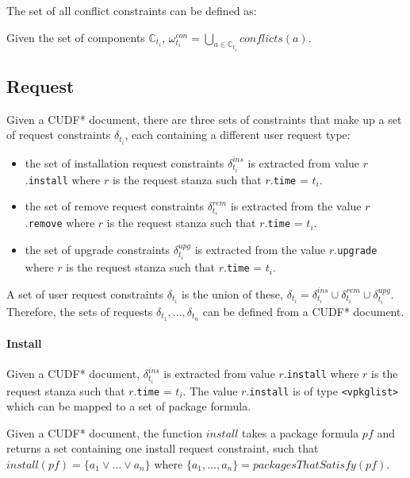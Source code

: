 The set of all conflict constraints can be defined as:
\begin{defs}
Given the set of components $\mathbb{C}_{t_i}$,
$\omega_{t_i}^{con} = \bigcup \limits_{a\in \mathbb{C}_{t_i}} conflicts(a)$.
\end{defs} 

\subsection{Request}
\label{formal.cudf.request}
Given a CUDF* document, there are three sets of constraints that make up a set of request constraints $\delta_{t_i}$, each containing a different user request type:
\begin{itemize}
  \item the set of installation request constraints $\delta_{t_i}^{ins}$ is extracted from value $r$.\texttt{install} where $r$ is the request stanza such that $r$.\texttt{time} = $t_i$.
  \item the set of remove request constraints  $\delta_{t_i}^{rem}$ is extracted from the value $r$.\texttt{remove} where $r$ is the request stanza such that $r$.\texttt{time} = $t_i$.
  \item the set of upgrade constraints $\delta_{t_i}^{upg}$ is extracted from the value $r$.\texttt{upgrade} where $r$ is the request stanza such that $r$.\texttt{time} = $t_i$.
\end{itemize}
A set of user request constraints $\delta_{t_i}$ is the union of these,
$\delta_{t_i} =  \delta_{t_i}^{ins} \cup \delta_{t_i}^{rem} \cup \delta_{t_i}^{upg}$.
Therefore, the sets of requests $\delta_{t_1},\ldots,\delta_{t_n}$ can be defined from a CUDF* document.

\paragraph{Install}
Given a CUDF* document, $\delta_{t_i}^{ins}$ is extracted from value $r$.\texttt{install} where $r$ is the request stanza such that $r$.\texttt{time} = $t_i$.
The value $r$.\texttt{install} is of type \texttt{<vpkglist>} which can be mapped to a set of package formula.
\begin{defs}
Given a CUDF* document, 
the function $install$ takes a package formula $pf$ and returns a set containing one install request constraint, 
such that $install(pf) = \{a_1 \vee \ldots \vee a_n\}$ where $\{a_1,\ldots,a_n\} = packagesThatSatisfy(pf)$.
\end{defs}

